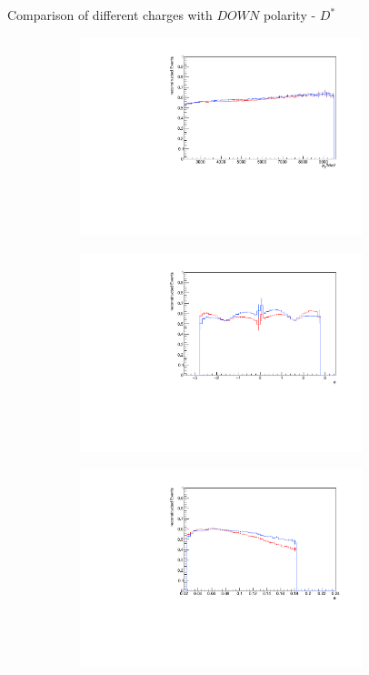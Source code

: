 \documentclass[11pt]{beamer}
\begin{document}
\begin{frame}{Comparison of different charges with $DOWN$ polarity - $D^*$}
\begin{figure}
\begin{subfigure}{0.45\textwidth}
\includegraphics[width=0.9\textwidth]{down_pdf/combined/h_pt_reco_Dst.pdf}
\end{subfigure}
\begin{subfigure}{0.45\textwidth}
\includegraphics[width=0.9\textwidth]{down_pdf/combined/h_phi_reco_Dst.pdf}
\end{subfigure}
\begin{subfigure}{0.45\textwidth}
\includegraphics[width=0.9\textwidth]{down_pdf/combined/h_theta_reco_Dst.pdf}

\end{subfigure}
\end{figure}
\end{frame}
\end{document}
